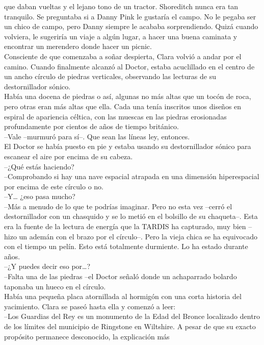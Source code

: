 {que daban vueltas y el lejano tono de un tractor. Shoreditch nunca era
tan tranquilo. Se preguntaba si a Danny Pink le gustaría el campo. No le
pegaba ser un chico de campo, pero Danny siempre le acababa
sorprendiendo. Quizá cuando volviera, le sugeriría un viaje a algún
lugar, a hacer una buena caminata y encontrar un merendero donde hacer
un picnic.\\
Consciente de que comenzaba a soñar despierta, Clara volvió a andar por
el camino. Cuando finalmente alcanzó al Doctor, estaba acuclillado en el
centro de un ancho círculo de piedras verticales, observando las
lecturas de su destornillador sónico.\\
Había una docena de piedras o así, algunas no más altas que un tocón de
roca, pero otras eran más altas que ella. Cada una tenía inscritos unos
diseños en espiral de apariencia céltica, con las muescas en las piedras
erosionadas profundamente por cientos de años de tiempo británico.\\
--Vale --murmuró para sí--. Que sean las líneas ley, entonces.\\
El Doctor se había puesto en pie y estaba usando su destornillador
sónico para escanear el aire por encima de su cabeza.\\
--¿Qué estás haciendo?\\
--Comprobando si hay una nave espacial atrapada en una dimensión
hiperespacial por encima de este círculo o no.\\
--Y\ldots{} ¿eso pasa mucho?\\
--Más a menudo de lo que te podrías imaginar. Pero no esta vez --cerró
el destornillador con un chasquido y se lo metió en el bolsillo de su
chaqueta--. Esta era la fuente de la lectura de energía que la TARDIS ha
capturado, muy bien --hizo un ademán con el brazo por el círculo--. Pero
la vieja chica se ha equivocado con el tiempo un pelín. Esto está
totalmente durmiente. Lo ha estado durante años.\\
--¿Y puedes decir eso por\ldots{}?\\
--Falta una de las piedras --el Doctor señaló donde un achaparrado
bolardo taponaba un hueco en el círculo.\\
Había una pequeña placa atornillada al hormigón con una corta historia
del yacimiento. Clara se paseó hasta ella y comenzó a leer:\\
--Los Guardias del Rey es un monumento de la Edad del Bronce localizado
dentro de los límites del municipio de Ringstone en Wiltshire. A pesar
de que su exacto propósito permanece desconocido, la explicación más
}

